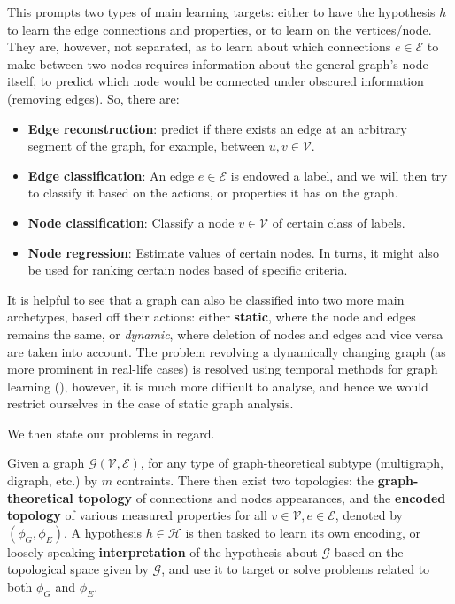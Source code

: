 \documentclass[10pt,oneside,oldfontcommands,dvipsnames,article]{memoir}
\begin{document}
This prompts two types of main learning targets: either to have the hypothesis $h$ to learn the edge connections and properties, or to learn on the vertices/node. They are, however, not separated, as to learn about which connections $e\in \mathcal{E}$ to make between two nodes requires information about the general graph's node itself, to predict which node would be connected under obscured information (removing edges). So, there are: 
\begin{itemize}[topsep=0pt,noitemsep]
    \item \textbf{Edge reconstruction}: predict if there exists an edge at an arbitrary segment of the graph, for example, between $u,v\in \mathcal{V}$. 
    \item \textbf{Edge classification}: An edge $e\in \mathcal{E}$ is endowed a label, and we will then try to classify it based on the actions, or properties it has on the graph. 
    \item \textbf{Node classification}: Classify a node $v\in \mathcal{V}$ of certain class of labels. 
    \item \textbf{Node regression}: Estimate values of certain nodes. In turns, it might also be used for ranking certain nodes based of specific criteria. 
\end{itemize}
It is helpful to see that a graph can also be classified into two more main archetypes, based off their actions: either \textbf{static}, where the node and edges remains the same, or \textit{dynamic}, where deletion of nodes and edges and vice versa are taken into account. The problem revolving a dynamically changing graph (as more prominent in real-life cases) is resolved using temporal methods for graph learning (\cite{rossi2020temporalgraphnetworksdeep}), however, it is much more difficult to analyse, and hence we would restrict ourselves in the case of static graph analysis. 

We then state our problems in regard. 

\begin{definition}
    Given a graph $\mathcal{G}(\mathcal{V},\mathcal{E})$, for any type of graph-theoretical subtype (multigraph, digraph, etc.) by $m$ contraints. There then exist two topologies: the \textbf{graph-theoretical topology} of connections and nodes appearances, and the \textbf{encoded topology} of various measured properties for all $v\in \mathcal{V}, e\in \mathcal{E}$, denoted by $(\phi_{G},\phi_{E})$. A hypothesis $h\in \mathcal{H}$ is then tasked to learn its own encoding, or loosely speaking \textbf{interpretation} of the hypothesis about $\mathcal{G}$ based on the topological space given by $\mathcal{G}$, and use it to target or solve problems related to both $\phi_{G}$ and $\phi_{E}$. 
\end{definition}
\end{document}
